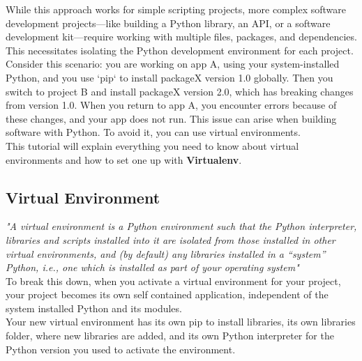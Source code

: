 \documentclass[12pt]{article}
\begin{document}
While this approach works for simple scripting projects, more complex software development projects—like building a Python library, an API, or a software development kit—require working with multiple files, packages, and dependencies. This necessitates isolating the Python development environment for each project.\\

Consider this scenario: you are working on app A, using your system-installed Python, and you use `pip` to install packageX version 1.0 globally. Then you switch to project B and install packageX version 2.0, which has breaking changes from version 1.0. When you return to app A, you encounter errors because of these changes, and your app does not run. This issue can arise when building software with Python. To avoid it, you can use virtual environments.\\

This tutorial will explain everything you need to know about virtual environments and how to set one up with \textbf{Virtualenv}.\\

\subsection{Virtual Environment}

\textit{"A virtual environment is a Python environment such that the Python interpreter, libraries and scripts installed into it are isolated from those installed in other virtual environments, and (by default) any libraries installed in a “system” Python, i.e., one which is installed as part of your operating system"}\\

To break this down, when you activate a virtual environment for your project, your project becomes its own self contained application, independent of the system installed Python and its modules.\\

Your new virtual environment has its own pip to install libraries, its own libraries folder, where new libraries are added, and its own Python interpreter for the Python version you used to activate the environment.\\
\end{document}
